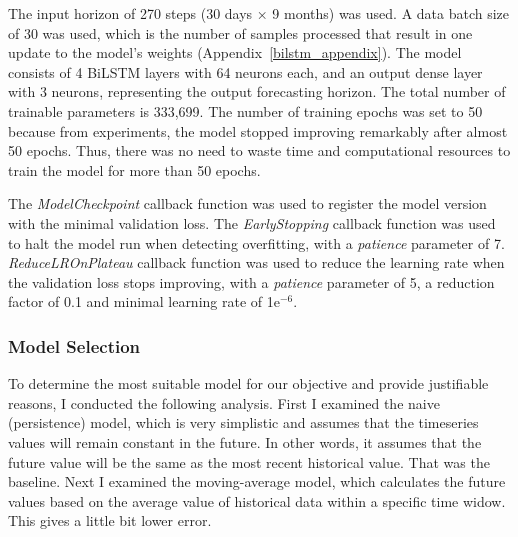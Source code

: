 The input horizon of 270 steps (30 days × 9 months) was used.
A data batch size of 30 was used, which is the number of samples processed that result in one update to the model's weights (Appendix~\ref{bilstm_appendix}).
The model consists of 4 BiLSTM layers with 64 neurons each, and an output dense layer with 3 neurons, representing the output forecasting horizon.
The total number of trainable parameters is 333,699.
The number of training epochs was set to 50 because from experiments, the model stopped improving remarkably after almost 50 epochs. Thus, there was no need to waste time and computational resources to train the model for more than 50 epochs.

The \textit{ModelCheckpoint} callback function was used to register the model version with the minimal validation loss. 
The \textit{EarlyStopping} callback function was used to halt the model run when detecting overfitting, with a \textit{patience} parameter of 7. 
\textit{ReduceLROnPlateau} callback function was used to reduce the learning rate when the validation loss stops improving, with a \textit{patience} parameter of 5, a reduction factor of 0.1 and minimal learning rate of 1e$^{-6}$.
\subsubsection{Model Selection}
To determine the most suitable model for our objective and provide justifiable reasons, I conducted the following analysis.
First I examined the naive (persistence) model, which is very simplistic and assumes that the timeseries values will remain constant in the future. In other words, it assumes that the future value will be the same as the most recent historical value. That was the baseline. Next I examined the moving-average model, which calculates the future values based on the average value of historical data within a specific time widow. This gives a little bit lower error.

